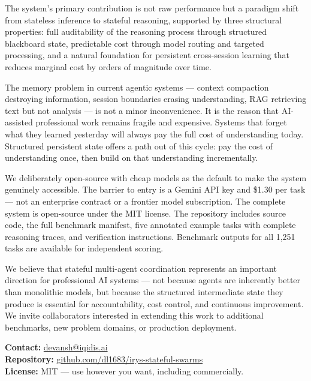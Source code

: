 \documentclass[11pt,a4paper]{article}
\begin{document}
The system's primary contribution is not raw performance but a paradigm shift from stateless inference to stateful reasoning, supported by three structural properties: full auditability of the reasoning process through structured blackboard state, predictable cost through model routing and targeted processing, and a natural foundation for persistent cross-session learning that reduces marginal cost by orders of magnitude over time.

The memory problem in current agentic systems — context compaction destroying information, session boundaries erasing understanding, RAG retrieving text but not analysis — is not a minor inconvenience. It is the reason that AI-assisted professional work remains fragile and expensive. Systems that forget what they learned yesterday will always pay the full cost of understanding today. Structured persistent state offers a path out of this cycle: pay the cost of understanding once, then build on that understanding incrementally.

We deliberately open-source with cheap models as the default to make the system genuinely accessible. The barrier to entry is a Gemini API key and \$1.30 per task — not an enterprise contract or a frontier model subscription. The complete system is open-source under the MIT license. The repository includes source code, the full benchmark manifest, five annotated example tasks with complete reasoning traces, and verification instructions. Benchmark outputs for all 1,251 tasks are available for independent scoring.

We believe that stateful multi-agent coordination represents an important direction for professional AI systems — not because agents are inherently better than monolithic models, but because the structured intermediate state they produce is essential for accountability, cost control, and continuous improvement. We invite collaborators interested in extending this work to additional benchmarks, new problem domains, or production deployment.

\vspace{1.5em}
\noindent\textbf{Contact:} \href{mailto:devansh@iqidis.ai}{devansh@iqidis.ai}\\
\textbf{Repository:} \href{https://github.com/dl1683/irys-stateful-swarms}{github.com/dl1683/irys-stateful-swarms}\\
\textbf{License:} MIT — use however you want, including commercially.

\end{document}
